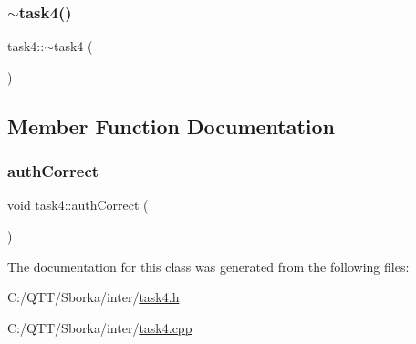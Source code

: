 \mbox{\label{classtask4_a452c5308f6ca5087584c8078af5504d8}} 
\subsubsection{\texorpdfstring{$\sim$task4()}{~task4()}}
{\footnotesize\ttfamily task4\+::$\sim$task4 (\begin{DoxyParamCaption}{ }\end{DoxyParamCaption})}



\subsection{Member Function Documentation}
\mbox{\label{classtask4_a8806f02eef52c03512e8c49cc64b1833}} 
\subsubsection{\texorpdfstring{auth\+Correct}{authCorrect}}
{\footnotesize\ttfamily void task4\+::auth\+Correct (\begin{DoxyParamCaption}{ }\end{DoxyParamCaption})\hspace{0.3cm}{\ttfamily [signal]}}



The documentation for this class was generated from the following files\+:\begin{DoxyCompactItemize}
\item 
C\+:/\+Q\+T\+T/\+Sborka/inter/\mbox{\hyperlink{task4_8h}{task4.\+h}}\item 
C\+:/\+Q\+T\+T/\+Sborka/inter/\mbox{\hyperlink{task4_8cpp}{task4.\+cpp}}\end{DoxyCompactItemize}
